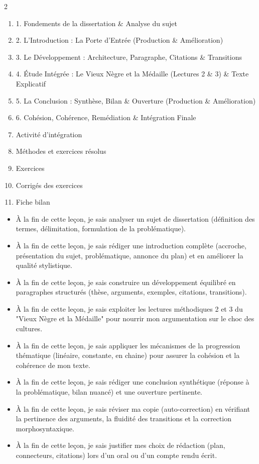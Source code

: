 \documentclass[11pt]{article}
\begin{document}
\begin{sommaire}
\begin{multicols}{2}
\begin{enumerate}
\item 1. Fondements de la dissertation \& Analyse du sujet
\item 2. L'Introduction : La Porte d'Entrée (Production \& Amélioration)
\item 3. Le Développement : Architecture, Paragraphe, Citations \& Transitions
\item 4. Étude Intégrée : Le Vieux Nègre et la Médaille (Lectures 2 \& 3) \& Texte Explicatif
\item 5. La Conclusion : Synthèse, Bilan \& Ouverture (Production \& Amélioration)
\item 6. Cohésion, Cohérence, Remédiation \& Intégration Finale
\item Activité d'intégration
\item Méthodes et exercices résolus
\item Exercices
\item Corrigés des exercices
\item Fiche bilan
\end{enumerate}
\end{multicols}
\end{sommaire}

\begin{objectifs}
\begin{itemize}
\item À la fin de cette leçon, je sais analyser un sujet de dissertation (définition des termes, délimitation, formulation de la problématique).
\item À la fin de cette leçon, je sais rédiger une introduction complète (accroche, présentation du sujet, problématique, annonce du plan) et en améliorer la qualité stylistique.
\item À la fin de cette leçon, je sais construire un développement équilibré en paragraphes structurés (thèse, arguments, exemples, citations, transitions).
\item À la fin de cette leçon, je sais exploiter les lectures méthodiques 2 et 3 du "Vieux Nègre et la Médaille" pour nourrir mon argumentation sur le choc des cultures.
\item À la fin de cette leçon, je sais appliquer les mécanismes de la progression thématique (linéaire, constante, en chaine) pour assurer la cohésion et la cohérence de mon texte.
\item À la fin de cette leçon, je sais rédiger une conclusion synthétique (réponse à la problématique, bilan nuancé) et une ouverture pertinente.
\item À la fin de cette leçon, je sais réviser ma copie (auto-correction) en vérifiant la pertinence des arguments, la fluidité des transitions et la correction morphosyntaxique.
\item À la fin de cette leçon, je sais justifier mes choix de rédaction (plan, connecteurs, citations) lors d'un oral ou d'un compte rendu écrit.
\end{itemize}
\end{objectifs}
\end{document}
